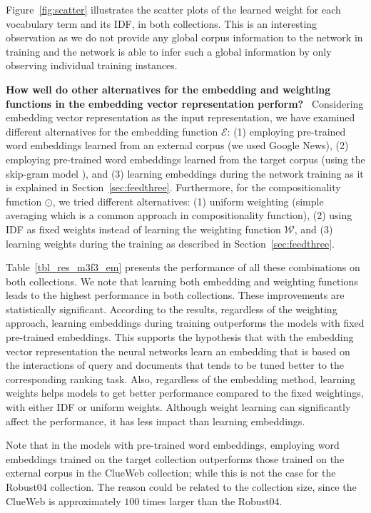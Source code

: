 \documentclass[sigconf]{acmart}
\newcommand{\feedthree}{embedding vector representation\xspace}
\newcommand{\mypar}[1]{\vspace*{-0.1ex}\medskip\noindent\textbf{#1}~}
\begin{document}
%
Figure~\ref{fig:scatter} illustrates the scatter plots of the learned weight for each vocabulary term and its IDF, in both collections.
This is an interesting observation as we do not provide any global corpus information to the network in training and the network is able to infer such a global information by only observing individual training instances.

\mypar{How well do other alternatives for the embedding and weighting functions in the \feedthree perform?}\newline 
Considering \feedthree as the input representation, we have examined different alternatives for the embedding function $\mathcal{E}$: (1) employing pre-trained word embeddings learned from an external corpus (we used Google News), (2) employing pre-trained word embeddings learned from the target corpus (using the skip-gram model \cite{Mikolov:2013}), and (3) learning embeddings during the network training as it is explained in Section~\ref{sec:feedthree}. 
Furthermore, for the compositionality function $\odot$, we tried different alternatives: (1) uniform weighting (simple averaging which is a common approach in compositionality function), (2) using IDF as fixed weights instead of learning the weighting function $\mathcal{W}$, and (3) learning weights during the training as described in Section~\ref{sec:feedthree}.

Table~\ref{tbl_res_m3f3_em} presents the performance of all these combinations on both collections. 
We note that learning both embedding and weighting functions leads to the highest performance in both collections. These improvements are statistically significant.
%
According to the results, regardless of the weighting approach, learning embeddings during training outperforms the models with fixed pre-trained embeddings.
%
This supports the hypothesis that with the \feedthree the neural networks learn an embedding that is based on the interactions of query and documents that tends to be tuned better to the corresponding ranking task.
%
Also, regardless of the embedding method, learning weights helps models to get better performance compared to the fixed weightings, with either IDF or uniform weights. 
%
Although weight learning can significantly affect the performance, it has less impact than learning embeddings.

Note that in the models with pre-trained word embeddings, employing word embeddings trained on the target collection outperforms those trained on the external corpus in the ClueWeb collection; while this is not the case for the Robust04 collection. The reason could be related to the collection size, since the ClueWeb is approximately $100$ times larger than the Robust04.
\end{document}
